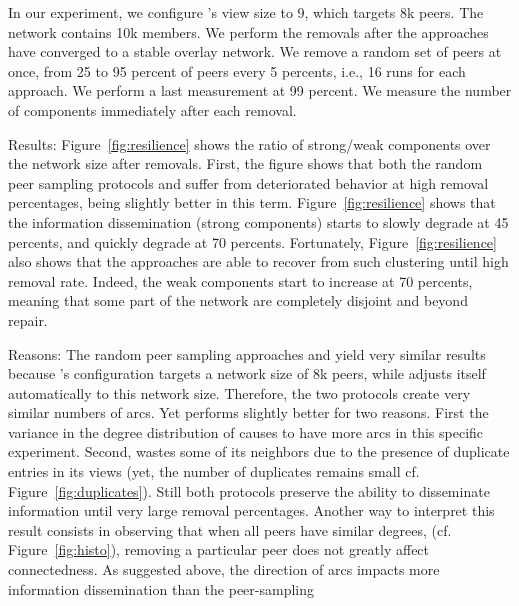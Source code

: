 \begin{asparadesc}
  In our experiment, we configure \CYCLON's view size to 9, which
  targets 8k peers. The network contains 10k members. We perform the
  removals after the approaches have converged to a stable overlay
  network. We remove a random set of peers at once, from 25 to 95 percent
  of peers every 5 percents, i.e., 16 runs for each approach. We
  perform a last measurement at 99 percent. We measure the number of
  components immediately after each removal.
\item[Results:] Figure~\ref{fig:resilience} shows the ratio of strong/weak
  components over the network size after removals. First, the figure shows that
  both the random peer sampling protocols \SPRAY and \CYCLON suffer from
  deteriorated behavior at high removal percentages, \CYCLON being slightly
  better in this term. Figure~\ref{fig:resilience} shows that the information
  dissemination (strong components) starts to slowly degrade at 45 percents, and
  quickly degrade at 70 percents. Fortunately, Figure~\ref{fig:resilience} also
  shows that the approaches are able to recover from such clustering until high
  removal rate. Indeed, the weak components start to increase at 70 percents,
  meaning that some part of the network are completely disjoint and beyond
  repair.%
\item[Reasons:] The random peer sampling approaches \CYCLON and \SPRAY
  yield very similar results because \CYCLON's configuration targets a
  network size of 8k peers, while \SPRAY adjusts itself automatically
  to this network size.  Therefore, the two protocols create very
  similar numbers of arcs. Yet \CYCLON performs slightly better for
  two reasons. First the variance in the degree distribution of \SPRAY
  causes \CYCLON to have more arcs in this specific
  experiment. Second, \SPRAY wastes some of its neighbors due to the
  presence of duplicate entries in its views (yet, the number of
  duplicates remains small cf. Figure~\ref{fig:duplicates}). Still
  both protocols preserve the ability to disseminate information until
  very large removal percentages. Another way to interpret this result
  consists in observing that when all peers have similar degrees,
  (cf. Figure~\ref{fig:histo}), removing a particular peer does not
  greatly affect connectedness. As suggested above, the direction of
  arcs impacts more information dissemination than the peer-sampling

\end{asparadesc}
